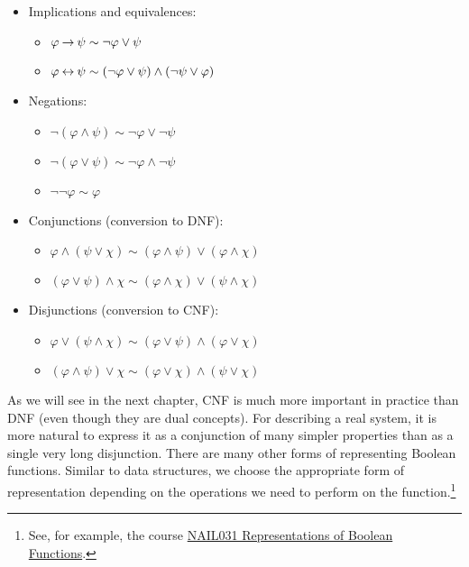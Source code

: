\begin{tcolorbox}
\begin{multicols}{2}
\begin{itemize}
    \item Implications and equivalences:
    \begin{itemize}
        \item[] $\varphi \mathbin{\rightarrow} \psi \sim \neg \varphi \lor \psi$
        \item[] $\varphi \mathbin{\leftrightarrow} \psi \sim (\neg \varphi \lor \psi) \land (\neg \psi \lor \varphi)$
    \end{itemize}
    \item Negations:
    \begin{itemize}
        \item[] $\neg (\varphi \land \psi) \sim \neg \varphi \lor \neg \psi$
        \item[] $\neg (\varphi \lor \psi) \sim \neg \varphi \land \neg \psi$
        \item[] $\neg \neg \varphi \sim \varphi$
    \end{itemize}
    \item Conjunctions (conversion to DNF):
    \begin{itemize}
        \item[] $\varphi \land (\psi \lor \chi) \sim (\varphi \land \psi) \lor (\varphi \land \chi)$
        \item[] $(\varphi \lor \psi) \land \chi \sim (\varphi \land \chi) \lor (\psi \land \chi)$
    \end{itemize}
    \item Disjunctions (conversion to CNF):
    \begin{itemize}
        \item[] $\varphi \lor (\psi \land \chi) \sim (\varphi \lor \psi) \land (\varphi \lor \chi)$
        \item[] $(\varphi \land \psi) \lor \chi \sim (\varphi \lor \chi) \land (\psi \lor \chi)$
    \end{itemize}
\end{itemize}
\end{multicols}
\end{tcolorbox}

As we will see in the next chapter, CNF is much more important in practice than DNF (even though they are dual concepts). For describing a real system, it is more natural to express it as a conjunction of many simpler properties than as a single very long disjunction. There are many other forms of representing Boolean functions. Similar to data structures, we choose the appropriate form of representation depending on the operations we need to perform on the function.\footnote{See, for example, the course \href{https://is.cuni.cz/studium/predmety/index.php?do=predmet&kod=NAIL031}{NAIL031 Representations of Boolean Functions}.}







